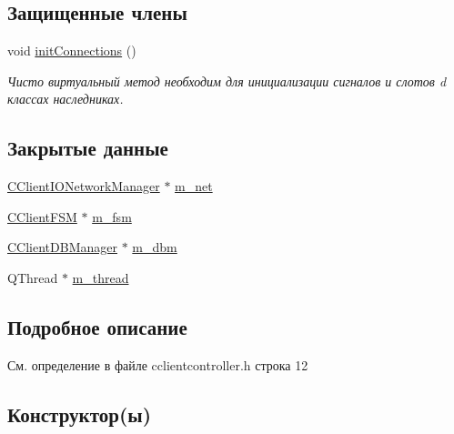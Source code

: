 \subsection*{Защищенные члены}
\begin{DoxyCompactItemize}
\item 
void \hyperlink{class_c_client_controller_a1dabfbc538daf66f1c2565808bc7db6d}{init\+Connections} ()
\begin{DoxyCompactList}\small\item\em Чисто виртуальный метод необходим для инициализации сигналов и слотов d классах наследниках. \end{DoxyCompactList}\end{DoxyCompactItemize}
\subsection*{Закрытые данные}
\begin{DoxyCompactItemize}
\item 
\hyperlink{class_c_client_i_o_network_manager}{C\+Client\+I\+O\+Network\+Manager} $\ast$ \hyperlink{class_c_client_controller_ae97793346f702b77829129673408df48}{m\+\_\+net}
\item 
\hyperlink{class_c_client_f_s_m}{C\+Client\+F\+SM} $\ast$ \hyperlink{class_c_client_controller_ade8b08c2eae487031b6b64dac3296f5d}{m\+\_\+fsm}
\item 
\hyperlink{class_c_client_d_b_manager}{C\+Client\+D\+B\+Manager} $\ast$ \hyperlink{class_c_client_controller_aacc71f5de726af350427a5eaedd6cf6c}{m\+\_\+dbm}
\item 
Q\+Thread $\ast$ \hyperlink{class_c_client_controller_ab573eef5149837a53b276c928d2b680d}{m\+\_\+thread}
\end{DoxyCompactItemize}


\subsection{Подробное описание}


См. определение в файле cclientcontroller.\+h строка 12



\subsection{Конструктор(ы)}
\hypertarget{class_c_client_controller_a95dd0dfe547a620dee2ae10790dee6be}{}\label{class_c_client_controller_a95dd0dfe547a620dee2ae10790dee6be} 
